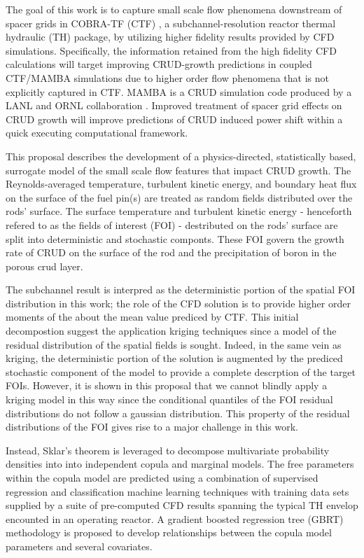 The goal of this work is to capture small scale flow phenomena downstream of spacer grids
in COBRA-TF (CTF) \cite{salko12}, a subchannel-resolution reactor thermal hydraulic (TH) package, by utilizing higher fidelity results provided by CFD simulations.  Specifically, the information retained from the high fidelity CFD calculations will target
 improving CRUD-growth predictions in coupled CTF/MAMBA
simulations due to higher order flow phenomena that is not explicitly captured in CTF.  MAMBA
is a CRUD simulation code produced by a LANL and ORNL collaboration \cite{collins16}.  Improved treatment of spacer grid effects on CRUD growth will improve predictions of CRUD induced
power shift within a quick executing computational framework.

This proposal describes the development of a physics-directed, statistically
based, surrogate model of the small scale flow features that impact CRUD growth.
The Reynolds-averaged temperature,
turbulent kinetic energy, and boundary heat flux on the surface of the fuel pin(s) are treated
as random fields distributed over the rods' surface. 
The surface temperature and turbulent kinetic energy - henceforth refered to as the fields of interest (FOI) - destributed on the rods' surface are split into deterministic and stochastic componts.  These FOI govern the growth rate of CRUD on the surface of the rod and the precipitation of boron in the porous crud layer.

The subchannel result is interpred as the deterministic portion of the
spatial FOI distribution in this work; the role of the CFD solution is to provide higher order
moments of the about the mean value prediced by CTF.
This initial decompostion suggest the application kriging techniques since a model
of the residual distribution of
the spatial fields is sought.  Indeed, in the same vein as kriging, the deterministic portion of the solution is augmented by the
prediced stochastic component of the model to provide a complete descrption of the target FOIs.
However, it is shown in this proposal that we cannot blindly apply a kriging model in this way since the
conditional quantiles of the FOI residual distributions do not follow a gaussian distribution.
This property of the residual distributions of the FOI gives rise to a major challenge
in this work.

Instead, Sklar's theorem is leveraged
to decompose multivariate probability densities into into independent copula
and marginal models. The free parameters within the copula model are predicted using a combination of supervised regression and classification machine learning techniques with training
data sets supplied by a suite of pre-computed CFD results spanning the typical TH envelop encounted in an operating reactor. A gradient boosted regression tree (GBRT) methodology is proposed to develop relationships between the copula model parameters and several covariates.


